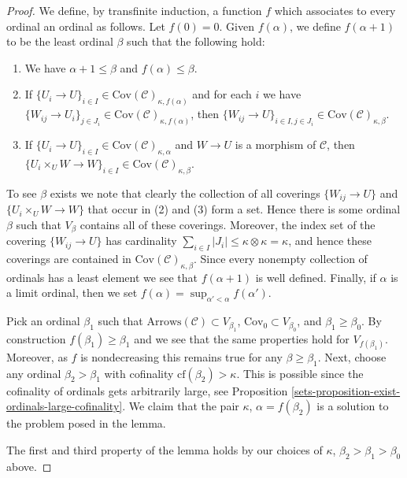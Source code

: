 \begin{proof}
\medskip\noindent
We define, by transfinite induction, a function $f$ which associates
to every ordinal an ordinal as follows. Let $f(0) = 0$.
Given $f(\alpha)$, we define $f(\alpha + 1)$ to be the least
ordinal $\beta$ such that the following hold:
\begin{enumerate}
\item We have $\alpha + 1 \leq \beta$ and $f(\alpha) \leq \beta$.
\item If $\{U_i \to U\}_{i\in I}
\in \text{Cov}(\mathcal{C})_{\kappa, f(\alpha)}$
and for each $i$ we have
$\{W_{ij} \to U_i\}_{j\in J_i}
\in \text{Cov}(\mathcal{C})_{\kappa, f(\alpha)}$,
then
$\{W_{ij} \to U\}_{i \in I, j\in J_i}
\in \text{Cov}(\mathcal{C})_{\kappa, \beta}$.
\item If $\{U_i \to U\}_{i\in I}
\in \text{Cov}(\mathcal{C})_{\kappa, \alpha}$
and $W \to U$ is a morphism of $\mathcal{C}$, then
$\{U_i \times_U W \to W \}_{i\in I}
\in \text{Cov}(\mathcal{C})_{\kappa, \beta}$.
\end{enumerate}
To see $\beta$ exists we note that clearly the collection of all
coverings $\{W_{ij} \to U\}$ and $\{U_i \times_U W \to W \}$ that occur in
(2) and (3) form a set. Hence there is some ordinal $\beta$ such that
$V_\beta$ contains all of these coverings. Moreover, the index set
of the covering $\{W_{ij} \to U\}$ has cardinality
$\sum_{i \in I} |J_i| \leq \kappa \otimes \kappa = \kappa$, and
hence these coverings are contained in
$\text{Cov}(\mathcal{C})_{\kappa, \beta}$.
Since every nonempty collection of ordinals has a least element
we see that $f(\alpha + 1)$ is well defined. Finally, if $\alpha$
is a limit ordinal, then we set
$f(\alpha) = \sup_{\alpha' < \alpha} f(\alpha')$.

\medskip\noindent
Pick an ordinal $\beta_1$ such that
$\text{Arrows}(\mathcal{C}) \subset V_{\beta_1}$,
$\text{Cov}_0 \subset V_{\beta_0}$,
and $\beta_1 \geq \beta_0$.
By construction $f(\beta_1) \geq \beta_1$ and we see that
the same properties hold for $V_{f(\beta_1)}$. Moreover, as $f$ is
nondecreasing this remains true for any $\beta \geq \beta_1$.
Next, choose any ordinal $\beta_2 > \beta_1$ with
cofinality $\text{cf}(\beta_2) > \kappa$. This is possible
since the cofinality of ordinals gets arbitrarily large, see
Proposition \ref{sets-proposition-exist-ordinals-large-cofinality}.
We claim that the pair $\kappa$,
$\alpha = f(\beta_2)$ is a solution to the problem posed in the lemma.

\medskip\noindent
The first and third property of the lemma holds by our choices
of $\kappa$, $\beta_2 > \beta_1 > \beta_0$ above.


\end{proof}
